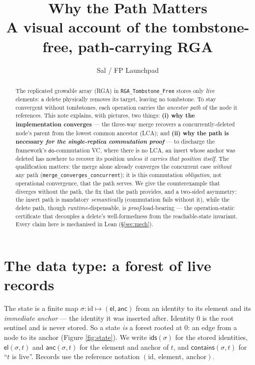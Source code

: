 \documentclass[11pt]{article}
\title{\bfseries Why the Path Matters\\[2pt]
\large A visual account of the tombstone-free, path-carrying RGA}
\author{Sal / FP Launchpad}
\date{}
\newcommand{\ids}{\mathsf{ids}}
\newcommand{\anc}{\mathsf{anc}}
\newcommand{\el}{\mathsf{el}}
\newcommand{\doo}{\mathsf{do}}
\newcommand{\contains}{\mathsf{contains}}
\begin{document}
\maketitle
\sloppy

\begin{abstract}
\noindent
The replicated growable array (RGA) in \texttt{RGA\_Tombstone\_Free} stores only
\emph{live} elements: a delete physically removes its target, leaving no
tombstone. To stay convergent without tombstones, each operation carries the
\emph{ancestor path} of the node it references. This note explains, with pictures,
two things: \textbf{(i) why the implementation converges} --- the three-way merge
recovers a concurrently-deleted node's parent from the lowest common ancestor
(LCA); and \textbf{(ii) why the path is necessary \emph{for the single-replica
commutation proof}} --- to discharge the framework's $\doo$-commutation VC, where
there is no LCA, an insert whose anchor was deleted has nowhere to recover its
position \emph{unless it carries that position itself}. The qualification matters:
the merge alone already converges the concurrent case \emph{without} any path
(\texttt{merge\_converges\_concurrent}); it is this commutation \emph{obligation},
not operational convergence, that the path serves. We give the
counterexample that diverges without the path, the fix that the path provides, and
a two-sided asymmetry: the insert path is mandatory \emph{semantically} (commutation
fails without it), while the delete path, though \emph{runtime}-dispensable, is
\emph{proof}-load-bearing --- the operation-static certificate that decouples a
delete's well-formedness from the reachable-state invariant. Every claim here is
mechanised in Lean (\S\ref{sec:mech}).
\end{abstract}

\section{The data type: a forest of live records}

The state is a finite map $\sigma : \mathrm{id} \mapsto (\el, \anc)$ from an
identity to its element and its \emph{immediate anchor} --- the identity it was
inserted after. Identity $0$ is the root sentinel and is never stored. So a state
\emph{is} a forest rooted at $0$: an edge from a node to its anchor (Figure
\ref{fig:state}). We write $\ids(\sigma)$ for the stored identities,
$\el(\sigma,t)$ and $\anc(\sigma,t)$ for the element and anchor of $t$, and
$\contains(\sigma,t)$ for ``$t$ is live''. Records use the reference notation
$(\mathrm{id},\ \mathrm{element},\ \mathrm{anchor})$.
\end{document}
